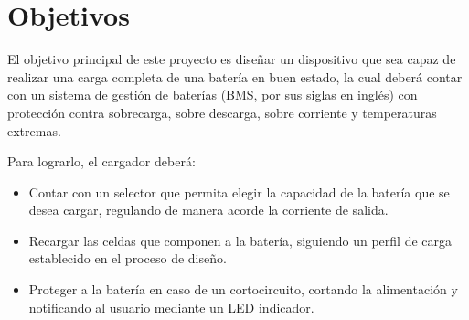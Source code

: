 \section{Objetivos}

El objetivo principal de este proyecto es diseñar un dispositivo que sea capaz de realizar
una carga completa de una batería en buen estado,
la cual deberá contar con un sistema de gestión de baterías (BMS, por sus siglas en inglés)
con protección contra sobrecarga, sobre descarga, sobre corriente y temperaturas extremas.

Para lograrlo, el cargador deberá:
\begin{itemize}
    \item Contar con un selector que permita elegir la capacidad de la batería que se desea cargar, regulando de manera acorde la corriente de salida.
    \item Recargar las celdas que componen a la batería, siguiendo un perfil de carga establecido en el proceso de diseño.
    \item Proteger a la batería en caso de un cortocircuito, cortando la alimentación y notificando al usuario mediante un LED indicador.
\end{itemize}